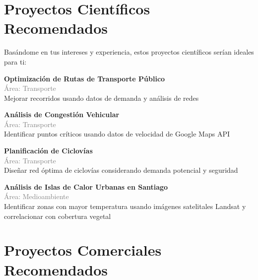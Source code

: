 \documentclass[11pt,a4paper]{article}
\begin{document}
\section*{ Proyectos Científicos Recomendados}

Basándome en tus intereses y experiencia, estos proyectos científicos serían ideales para ti:


\begin{tcolorbox}[colback=green!5,colframe=darkgreen,title={\small Proyecto Científico \#1}]
\textbf{Optimización de Rutas de Transporte Público}\\[0.2cm]
\textcolor{gray}{\small Área: Transporte}\\[0.2cm]
Mejorar recorridos usando datos de demanda y análisis de redes
\end{tcolorbox}


\begin{tcolorbox}[colback=green!5,colframe=darkgreen,title={\small Proyecto Científico \#2}]
\textbf{Análisis de Congestión Vehicular}\\[0.2cm]
\textcolor{gray}{\small Área: Transporte}\\[0.2cm]
Identificar puntos críticos usando datos de velocidad de Google Maps API
\end{tcolorbox}


\begin{tcolorbox}[colback=green!5,colframe=darkgreen,title={\small Proyecto Científico \#3}]
\textbf{Planificación de Ciclovías}\\[0.2cm]
\textcolor{gray}{\small Área: Transporte}\\[0.2cm]
Diseñar red óptima de ciclovías considerando demanda potencial y seguridad
\end{tcolorbox}


\begin{tcolorbox}[colback=green!5,colframe=darkgreen,title={\small Proyecto Científico \#4}]
\textbf{Análisis de Islas de Calor Urbanas en Santiago}\\[0.2cm]
\textcolor{gray}{\small Área: Medioambiente}\\[0.2cm]
Identificar zonas con mayor temperatura usando imágenes satelitales Landsat y correlacionar con cobertura vegetal
\end{tcolorbox}


\section*{ Proyectos Comerciales Recomendados}
\end{document}
